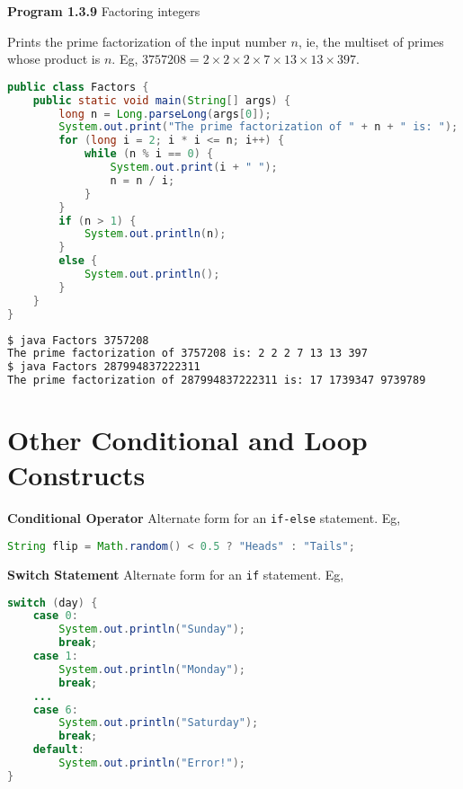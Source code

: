 \documentclass[8pt,a4paper,compress]{beamer}
\begin{document}
\begin{frame}[fragile]
\pause

\textbf{Program 1.3.9} Factoring integers

\begin{framed}
\tiny Prints the prime factorization of the input number $n$, ie, the multiset of primes whose product is $n$. Eg, $3757208 = 2 \times 2 \times 2 \times 7 \times 13 \times 13 \times 397$.
\end{framed}

\begin{lstlisting}[language=Java]
public class Factors {
    public static void main(String[] args) { 
        long n = Long.parseLong(args[0]);
        System.out.print("The prime factorization of " + n + " is: ");
        for (long i = 2; i * i <= n; i++) { 
            while (n % i == 0) {
                System.out.print(i + " "); 
                n = n / i;
            }
        }
        if (n > 1) { 
            System.out.println(n);
        }
        else {       
            System.out.println();
        }
    }
}
\end{lstlisting}

\pause

\begin{lstlisting}[language=bash]
$ java Factors 3757208
The prime factorization of 3757208 is: 2 2 2 7 13 13 397
$ java Factors 287994837222311
The prime factorization of 287994837222311 is: 17 1739347 9739789
\end{lstlisting}
\end{frame}

\section{Other Conditional and Loop Constructs}
\begin{frame}[fragile]
\pause

\textbf{Conditional Operator} Alternate form for an \lstinline$if-else$ statement. Eg, 

\begin{lstlisting}[language=Java]
String flip = Math.random() < 0.5 ? "Heads" : "Tails";
\end{lstlisting}

\pause
\smallskip

\textbf{Switch Statement} Alternate form for an \lstinline$if$ statement. Eg, 

\begin{lstlisting}[language=Java]
switch (day) {
    case 0:
        System.out.println("Sunday");
        break;
    case 1:
        System.out.println("Monday");
        break;
    ...
    case 6:
        System.out.println("Saturday");
        break;
    default:
        System.out.println("Error!");
}
\end{lstlisting}

\end{frame}
\end{document}
